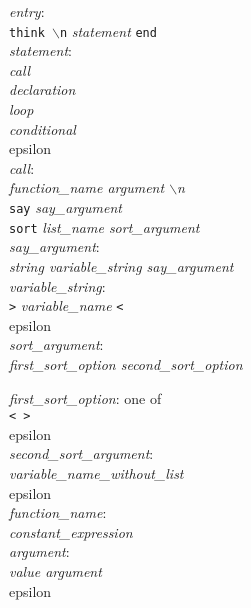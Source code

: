 \documentclass[a4paper]{article}
\begin{document}
\noindent\textit{entry}:\\
\indent\texttt{think $\backslash$n} \textit{statement} \texttt{end}\\

\noindent\textit{statement}:\\
\indent\textit{call}\\
\indent\textit{declaration}\\
\indent\textit{loop}\\
\indent\textit{conditional}\\
\indent epsilon\\

\noindent\textit{call}:\\
\indent\textit{function\_name argument $\backslash$n}\\
\indent \texttt{say} \textit{say\_argument}\\
\indent \texttt{sort} \textit{list\_name sort\_argument}\\

\noindent\textit{say\_argument}:\\
\indent\textit{string variable\_string say\_argument}\\

\noindent\textit{variable\_string}:\\
\indent\texttt{>} \textit{variable\_name} \texttt{<}\\
\indent epsilon\\

\noindent\textit{sort\_argument}:\\
\indent \textit{first\_sort\_option second\_sort\_option}\\

\pagebreak

\noindent\textit{first\_sort\_option}: one of\\
\indent\texttt{< >}\\
\indent epsilon\\

\noindent\textit{second\_sort\_argument}:\\
\indent\textit{variable\_name\_without\_list}\\
\indent epsilon\\

\noindent\textit{function\_name}:\\
\indent\textit{constant\_expression}\\

\noindent\textit{argument}:\\
\indent\textit{value argument}\\
\indent epsilon\\
\end{document}
